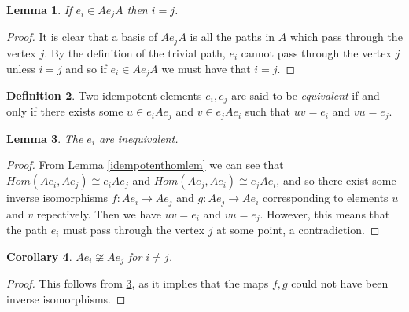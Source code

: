 \documentclass[11.5pt, twoside, a4paper, titlepage]{report}
\theoremstyle{definition}
\newtheorem{mydef}{Definition}[section]
\theoremstyle{plain}
\newtheorem{lem}[mydef]{Lemma}
\newtheorem{cor}[mydef]{Corollary}
\begin{document}
\begin{lem} \label{idempotentsi=jlem}
If $e_i \in Ae_jA$ then $i=j$.
\end{lem}
\begin{proof}
It is clear that a basis of $Ae_jA$ is all the paths in $A$ which pass through the vertex $j$. By the definition of the trivial path, $e_i$ cannot pass through the vertex $j$ unless $i=j$ and so if $e_i \in Ae_jA$ we must have that $i=j$.
\end{proof}

\begin{mydef}
Two idempotent elements $e_i, e_j$ are said to be \emph{equivalent} if and only if there exists some $u\in e_iAe_j$ and $v \in e_jAe_i$ such that $uv=e_i$ and $vu=e_j$. 
\end{mydef}

\begin{lem}\label{inequivalentlem}
The $e_i$ are inequivalent.
\end{lem}
\begin{proof}
From Lemma \ref{idempotenthomlem} we can see that $Hom(Ae_i, Ae_j)\cong e_iAe_j$ and $Hom(Ae_j, Ae_i)\cong e_jAe_i$, and so there exist some inverse isomorphisms $f: Ae_i \to Ae_j$ and $g: Ae_j \to Ae_i$ corresponding to elements $u$ and $v$ repectively. Then we have $uv=e_i$ and $vu=e_j$. However, this means that the path $e_i$ must pass through the vertex $j$ at some point, a contradiction.
\end{proof}

\begin{cor}
$Ae_i \not\cong Ae_j$ for $i \neq j$.
\end{cor}
\begin{proof}
This follows from \ref{inequivalentlem}, as it implies that the maps $f,g$ could not have been inverse isomorphisms.
\end{proof}
\end{document}
